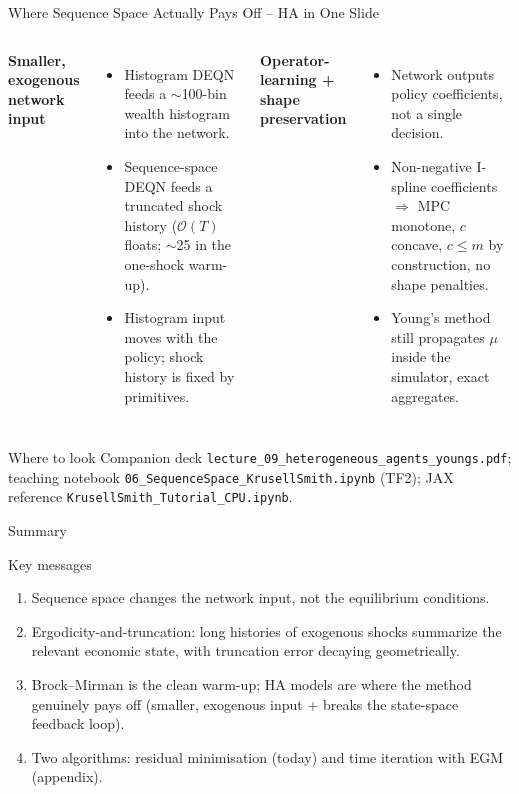 \documentclass[aspectratio=169,11pt]{beamer}
\newcommand{\emphc}[1]{\textcolor{harvardcrimson}{#1}}
\begin{document}
\begin{frame}{Where Sequence Space Actually Pays Off -- HA in One Slide}
\small
\begin{columns}[T]
\textbf{Smaller, exogenous network input}
\begin{itemize}\itemsep2pt
    \item Histogram DEQN feeds a \emphc{$\sim$100-bin wealth histogram} into the network.
    \item Sequence-space DEQN feeds a \emphc{truncated shock history} ($\mathcal{O}(T)$ floats; $\sim$25 in the one-shock warm-up).
    \item Histogram input \emphc{moves with the policy}; shock history is fixed by primitives.
\end{itemize}

\textbf{Operator-learning + shape preservation}
\begin{itemize}\itemsep2pt
    \item Network outputs \emphc{policy coefficients}, not a single decision.
    \item Non-negative I-spline coefficients $\Rightarrow$ MPC monotone, $c$ concave, $c \le m$ \emphc{by construction}, no shape penalties.
    \item Young's method still propagates $\mu$ \emphc{inside the simulator}, exact aggregates.
\end{itemize}
\end{columns}

\vspace{0.3em}
\begin{block}{Where to look}
Companion deck \texttt{lecture\_09\_heterogeneous\_agents\_youngs.pdf}; teaching notebook \texttt{06\_SequenceSpace\_KrusellSmith.ipynb} (TF2); JAX reference \texttt{KrusellSmith\_Tutorial\_CPU.ipynb}.
\end{block}
\end{frame}


\begin{frame}{Summary}
\small
\begin{block}{Key messages}
\begin{enumerate}\itemsep4pt
    \item Sequence space changes the \emphc{network input}, not the equilibrium conditions.
    \item Ergodicity-and-truncation: long histories of exogenous shocks summarize the relevant economic state, with truncation error decaying geometrically.
    \item Brock--Mirman is the clean warm-up; HA models are where the method genuinely pays off (smaller, exogenous input + breaks the state-space feedback loop).
    \item Two algorithms: residual minimisation (today) and time iteration with EGM (appendix).
\end{enumerate}
\end{block}
\end{frame}
\end{document}
